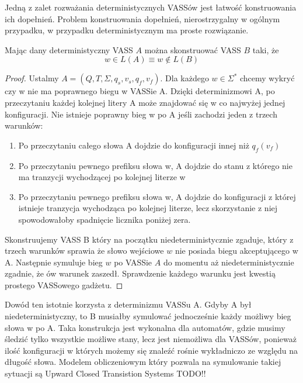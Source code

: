     Jedną z zalet rozważania deterministycznych VASSów jest łatwość konstruowania ich dopełnień.
    Problem konstruowania dopełnień, nierostrzygalny w ogólnym przypadku, w przypadku deterministycznym ma proste rozwiązanie.


    \begin{lemma}
        \label{det-closure}
        Mając dany deterministyczny VASS $A$ można skonstruować VASS $B$ taki, że
        \[w \in L(A) \equiv w \notin L(B)\]
    \end{lemma}
    \begin{proof}
        Ustalmy $A = (Q,T,\Sigma,q_s,v_s,q_f,v_f)$.
        Dla każdego $w \in \Sigma^*$ chcemy wykryć czy w nie ma poprawnego biegu w VASSie A.
        Dzięki determinizmowi A, po przeczytaniu każdej kolejnej litery A może znajdować się w co najwyżej jednej konfiguracji.
        Nie istnieje poprawny bieg w po A jeśli zachodzi jeden z trzech warunków:
        \begin{enumerate}
            \item Po przeczytaniu całego słowa A dojdzie do konfiguracji innej niż $q_f(v_f)$
            \item Po przeczytaniu pewnego prefiksu słowa w, A dojdzie do stanu z którego nie ma tranzycji wychodzącej po kolejnej literze w
            \item Po przeczytaniu pewnego prefiksu słowa w, A dojdzie do konfiguracji z której istnieje tranzycja wychodząca po kolejnej literze,
            lecz skorzystanie z niej spowodowałoby spadnięcie licznika poniżej zera.
        \end{enumerate}

        Skonstruujemy VASS B który na początku niedeterministycznie zgaduje, który z trzech warunków sprawia że słowo wejściowe $w$
        nie posiada biegu akceptującego w A.
        Następnie symuluje bieg $w$ po VASSie $A$ do momentu aż niedeterministycznie zgadnie, że ów warunek zaszedł.
        Sprawdzenie każdego warunku jest kwestią prostego VASSowego gadżetu.

    \end{proof}
    Dowód ten istotnie korzysta z determinizmu VASSu A.
    Gdyby A był niedeterministyczny, to B musiałby symulować jednocześnie każdy możliwy bieg słowa w po A.
    Taka konstrukcja jest wykonalna dla automatów, gdzie musimy śledzić tylko wszystkie możliwe stany,
    lecz jest niemożliwa dla VASSów, ponieważ ilość konfiguracji w których możemy się znaleźć rośnie wykładniczo ze względu na długość słowa.
    Modelem obliczeniowym który pozwala na symulowanie takiej sytuacji są Upward Closed Transistion Systems TODO!!


